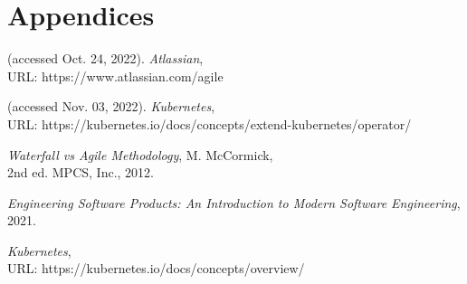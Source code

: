 \documentclass{article}
\begin{document}
\section{Appendices}






\clearpage
\begin{thebibliography}{9}


(accessed Oct. 24, 2022). 
\emph{Atlassian}, \\URL: https://www.atlassian.com/agile 

(accessed Nov. 03, 2022).
\emph{Kubernetes}, \\URL: https://kubernetes.io/docs/concepts/extend-kubernetes/operator/

\emph{Waterfall vs Agile Methodology}, M. McCormick, \\2nd ed. MPCS, Inc., 2012.

\emph{Engineering Software Products: An Introduction to Modern Software Engineering}, 2021.
  
\emph{Kubernetes}, \\URL: https://kubernetes.io/docs/concepts/overview/  


\end{thebibliography}
\end{document}
